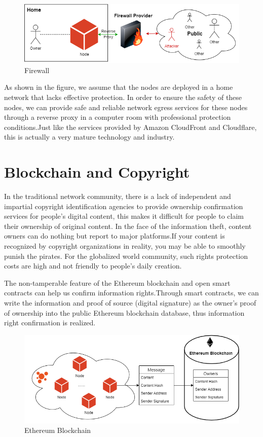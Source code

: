 \documentclass{article}
\begin{document}
    \begin{figure}[H]
        \centering
        \includegraphics[width=\textwidth]{figures-firewall.png}
        \caption{Firewall}
    \end{figure}

    As shown in the figure, we assume that the nodes are deployed in a home network that lacks effective protection. In order to ensure the safety of these nodes, we can provide safe and reliable network egress services for these nodes through a reverse proxy in a computer room with professional protection conditions.Just like the services provided by Amazon CloudFront and Cloudflare, this is actually a very mature technology and industry.
\section{Blockchain and Copyright}
    In the traditional network community, there is a lack of independent and impartial copyright identification agencies to provide ownership confirmation services for people's digital content, this makes it difficult for people to claim their ownership of original content. In the face of the information theft, content owners can do nothing but report to major platforms.If your content is recognized by copyright organizations in reality, you may be able to smoothly punish the pirates. For the globalized world community, such rights protection costs are high and not friendly to people's daily creation.

    The non-tamperable feature of the Ethereum blockchain and open smart contracts can help us confirm information rights.Through smart contracts, we can write the information and proof of source (digital signature) as the owner's proof of ownership into the public Ethereum blockchain database, thus information right confirmation is realized.


    \begin{figure}[H]
        \centering
        \includegraphics[width=\textwidth]{figures-blockchain.png}
        \caption{Ethereum Blockchain}
    \end{figure}
    
\end{document}
